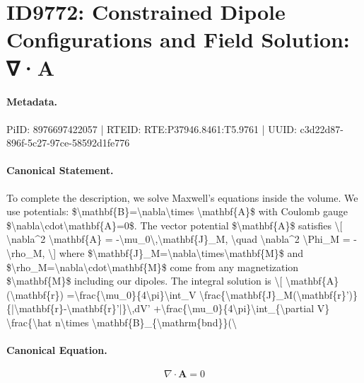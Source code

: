 \section*{ID9772: Constrained Dipole Configurations and Field Solution: ∇·A}
\paragraph{Metadata.}
PiID: 8976697422057 | RTEID: RTE:P37946.8461:T5.9761 | UUID: c3d22d87-896f-5c27-97ce-58592d1fe776

\paragraph{Canonical Statement.}
To complete the description, we solve Maxwell's equations inside the volume. We use potentials: \$\textbackslash{}mathbf\{B\}=\textbackslash{}nabla\textbackslash{}times \textbackslash{}mathbf\{A\}\$ with Coulomb gauge \$\textbackslash{}nabla\textbackslash{}cdot\textbackslash{}mathbf\{A\}=0\$. The vector potential \$\textbackslash{}mathbf\{A\}\$ satisfies \textbackslash{}[ \textbackslash{}nabla\textasciicircum{}2 \textbackslash{}mathbf\{A\} = -\textbackslash{}mu\_0\textbackslash{},\textbackslash{}mathbf\{J\}\_M, \textbackslash{}quad \textbackslash{}nabla\textasciicircum{}2 \textbackslash{}Phi\_M = -\textbackslash{}rho\_M, \textbackslash{}] where \$\textbackslash{}mathbf\{J\}\_M=\textbackslash{}nabla\textbackslash{}times\textbackslash{}mathbf\{M\}\$ and \$\textbackslash{}rho\_M=\textbackslash{}nabla\textbackslash{}cdot\textbackslash{}mathbf\{M\}\$ come from any magnetization \$\textbackslash{}mathbf\{M\}\$ including our dipoles. The integral solution is \textbackslash{}[ \textbackslash{}mathbf\{A\}(\textbackslash{}mathbf\{r\}) =\textbackslash{}frac\{\textbackslash{}mu\_0\}\{4\textbackslash{}pi\}\textbackslash{}int\_V \textbackslash{}frac\{\textbackslash{}mathbf\{J\}\_M(\textbackslash{}mathbf\{r\}')\}\{|\textbackslash{}mathbf\{r\}-\textbackslash{}mathbf\{r\}'|\}\textbackslash{},dV' +\textbackslash{}frac\{\textbackslash{}mu\_0\}\{4\textbackslash{}pi\}\textbackslash{}int\_\{\textbackslash{}partial V\} \textbackslash{}frac\{\textbackslash{}hat n\textbackslash{}times \textbackslash{}mathbf\{B\}\_\{\textbackslash{}mathrm\{bnd\}\}(\textbackslash{}

\paragraph{Canonical Equation.}
\[
\nabla\cdot\mathbf{A}=0
\]

